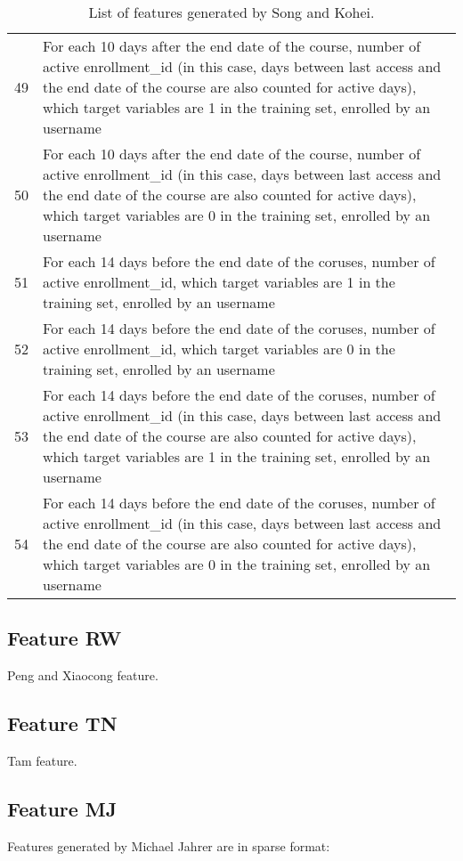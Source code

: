 \begin{center}
\begin{table*}[ht]
\begin{minipage}{\textwidth}
{\begin{tabular}{|l|l|}
      49 & For each 10 days after the end date of the course, number of active enrollment\_id (in this case, days between last access and the end date of the course are also counted for active days), which target variables are 1 in the training set, enrolled by an username \tabularnewline 
      50 & For each 10 days after the end date of the course, number of active enrollment\_id (in this case, days between last access and the end date of the course are also counted for active days), which target variables are 0 in the training set, enrolled by an username \tabularnewline 
      51 & For each 14 days before the end date of the coruses, number of active enrollment\_id, which target variables are 1 in the training set, enrolled by an username \tabularnewline 
      52 & For each 14 days before the end date of the coruses, number of active enrollment\_id, which target variables are 0 in the training set, enrolled by an username \tabularnewline 
      53 & For each 14 days before the end date of the coruses, number of active enrollment\_id (in this case, days between last access and the end date of the course are also counted for active days), which target variables are 1 in the training set, enrolled by an username \tabularnewline 
      54 & For each 14 days before the end date of the coruses, number of active enrollment\_id (in this case, days between last access and the end date of the course are also counted for active days), which target variables are 0 in the training set, enrolled by an username \tabularnewline 
      \hline
      \end{tabular}
    }
    \hfill{}
    \caption{List of features generated by Song and Kohei.}
    \label{tb:skfeature}
    \end{minipage}
  \end{table*}
\end{center}

\subsection{Feature RW}
Peng and Xiaocong feature.

\subsection{Feature TN}
Tam feature.

\subsection{Feature MJ}
Features generated by Michael Jahrer are in sparse format:

